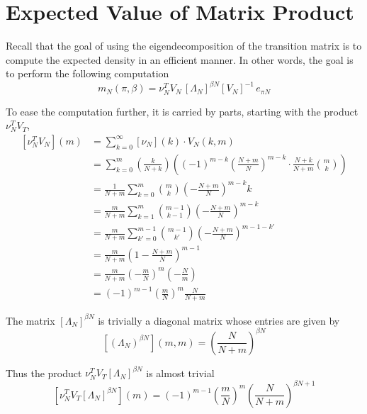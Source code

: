 \documentclass{article}
\newcommand{\ppar}[1]{\left( #1 \right)}
\newcommand{\spar}[1]{\left[ #1 \right]}
\begin{document}
\section{Expected Value of Matrix Product}
\label{ap:product}

Recall that the goal of using the eigendecomposition of the transition matrix is to compute the expected density in an efficient manner.
%
In other words, the goal is to perform the following computation
\begin{equation}
    m_N(\pi, \beta) = 
    {\nu_N^T 
    V_N}\, \spar{\Lambda_N}^{\beta N} \spar{V_N}^{-1}\,e_{\pi N}
\end{equation}

%
To ease the computation further, it is carried by parts, starting with the product $\nu_N^T V_T$,
\begin{align*}
    \spar{\nu_N^T V_N}(m) &=
    \sum_{k=0}^\infty \spar{\nu_N}(k) \cdot V_N(k,m) \\
    &=
    \sum_{k=0}^m
    \ppar{\frac{k}{N+k}}
    \ppar{(-1)^{m-k} \ppar{\frac{N+m}{N}}^{m-k} \cdot \frac{N+k}{N+m} \binom{m}{k}}
    \\
    &=
    \frac{1}{N+m}
    \sum_{k=0}^m
    \binom{m}{k}
    \ppar{- \frac{N+m}{N}}^{m-k} k
    \\
    &=
    \frac{m}{N+m}
    \sum_{k=1}^m
    \binom{m-1}{k-1}
    \ppar{- \frac{N+m}{N}}^{m-k}
    \\
    &=
    \frac{m}{N+m}
    \sum_{k'=0}^{m-1}
    \binom{m-1}{k'}
    \ppar{- \frac{N+m}{N}}^{m-1-k'}
    \\
    &=
    \frac{m}{N+m}
    \ppar{1-\frac{N+m}{N}}^{m-1}
    \\
    &=
    \frac{m}{N+m}
    \ppar{-\frac{m}{N}}^m \ppar{-\frac{N}{m}}
    \\
    &=
    (-1)^{m-1} \ppar{\frac{m}{N}}^m \frac{N}{N+m}
\end{align*}

The matrix $\spar{\Lambda_N}^{\beta N}$ is trivially a diagonal matrix whose entries are given by
\begin{equation}
    \spar{\ppar{\Lambda_N}^{\beta N}}(m,m)
    =
    \ppar{\frac{N}{N+m}}^{\beta N}
\end{equation}

Thus the product $\nu_N^T V_T \spar{\Lambda_N}^{\beta N}$ is almost trivial
\begin{equation}
    \spar{\nu_N^T V_T \spar{\Lambda_N}^{\beta N}}(m)
    =
    (-1)^{m-1} \ppar{\frac{m}{N}}^m
    \ppar{\frac{N}{N+m}}^{\beta N+1}
\end{equation}
\end{document}
